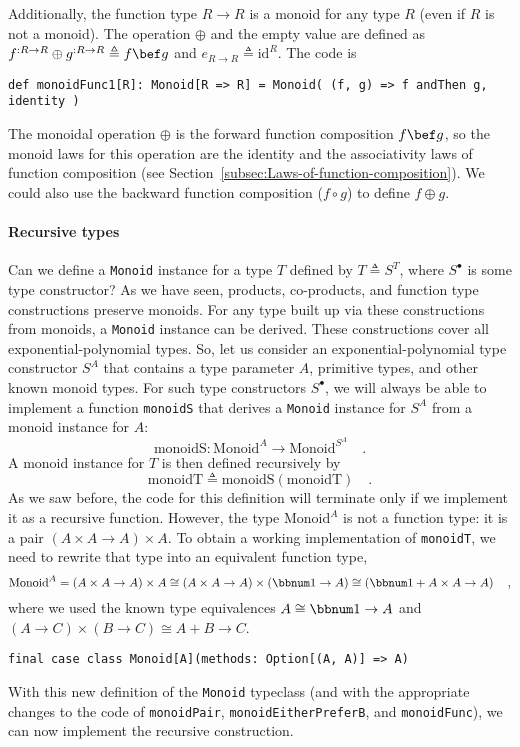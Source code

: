 Additionally, the function type $R\rightarrow R$ is a monoid for
any type $R$ (even if $R$ is not a monoid). The operation $\oplus$
and the empty value are defined as $f^{:R\rightarrow R}\oplus g^{:R\rightarrow R}\triangleq f\bef g$
and $e_{R\rightarrow R}\triangleq\text{id}^{R}$. The code is
\begin{lstlisting}
def monoidFunc1[R]: Monoid[R => R] = Monoid( (f, g) => f andThen g, identity )
\end{lstlisting}
The monoidal operation $\oplus$ is the forward function composition
$f\bef g$, so the monoid laws for this operation are the identity
and the associativity laws of function composition (see Section~\ref{subsec:Laws-of-function-composition}).
We could also use the backward function composition ($f\circ g$)
to define $f\oplus g$.

\paragraph{Recursive types}

Can we define a \lstinline!Monoid! instance for a type $T$ defined
by $T\triangleq S^{T}$, where $S^{\bullet}$ is some type constructor?
As we have seen, products, co-products, and function type constructions
preserve monoids. For any type built up via these constructions from
monoids, a \lstinline!Monoid! instance can be derived. These constructions
cover all exponential-polynomial types. So, let us consider an exponential-polynomial
type constructor $S^{A}$ that contains a type parameter $A$, primitive
types, and other known monoid types. For such type constructors $S^{\bullet}$,
we will always be able to implement a function \lstinline!monoidS!
that derives a \lstinline!Monoid! instance for $S^{A}$ from a monoid
instance for $A$:
\[
\text{monoidS}:\text{Monoid}^{A}\rightarrow\text{Monoid}^{S^{A}}\quad.
\]
A monoid instance for $T$ is then defined recursively by
\[
\text{monoidT}\triangleq\text{monoidS}\left(\text{monoidT}\right)\quad.
\]
As we saw before, the code for this definition will terminate only
if we implement it as a recursive function. However, the type $\text{Monoid}^{A}$
is not a function type: it is a pair $\left(A\times A\rightarrow A\right)\times A$.
To obtain a working implementation of \lstinline!monoidT!, we need
to rewrite that type into an equivalent function type,
\[
\text{Monoid}^{A}=\left(A\times A\rightarrow A\right)\times A\cong\left(A\times A\rightarrow A\right)\times\left(\bbnum 1\rightarrow A\right)\cong\left(\bbnum 1+A\times A\rightarrow A\right)\quad,
\]
where we used the known type equivalences $A\cong\bbnum 1\rightarrow A$
and $\left(A\rightarrow C\right)\times\left(B\rightarrow C\right)\cong A+B\rightarrow C$.
\begin{lstlisting}
final case class Monoid[A](methods: Option[(A, A)] => A)
\end{lstlisting}
With this new definition of the \lstinline!Monoid! typeclass (and
with the appropriate changes to the code of \lstinline!monoidPair!,
\lstinline!monoidEitherPreferB!, and \lstinline!monoidFunc!), we
can now implement the recursive construction.

